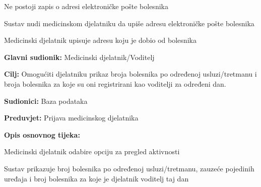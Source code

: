 \begin{packed_item}
\begin{packed_enum}
				
			\end{packed_enum}
		
			\item[4.a] Ne postoji zapis o adresi elektroničke pošte bolesnika
			\item[] \begin{packed_enum}
			
				\item Sustav nudi medicinskom djelatniku da upiše adresu elektroničke pošte bolesnika
				\item Medicinski djelatnik upisuje adresu koju je dobio od bolesnika
			
			
			\end{packed_enum}		
		\end{packed_item}

			\pagebreak
			\noindent {}
			\begin{packed_item}
				
				\item \textbf{Glavni sudionik: }Medicinski djelatnik/Voditelj
				\item  \textbf{Cilj:} Omogućiti djelatniku prikaz
				broja bolesnika po određenoj usluzi/tretmanu i broja bolesnika za koje su oni registrirani kao voditelji za određeni dan.
				\item  \textbf{Sudionici:} Baza podataka
				\item  \textbf{Preduvjet:} Prijava medicinskog djelatnika
				\item  \textbf{Opis osnovnog tijeka:}
				
				
				\item[] \begin{packed_enum}
					
					\item Medicinski djelatnik odabire opciju za pregled aktivnosti
					\item Sustav prikazuje broj bolesnika po određenoj usluzi/tretmanu, zauzeće pojedinih uređaja i broj bolesnika za koje je djelatnik voditelj taj dan
				\end{packed_enum}
				
			\end{packed_item}
				
